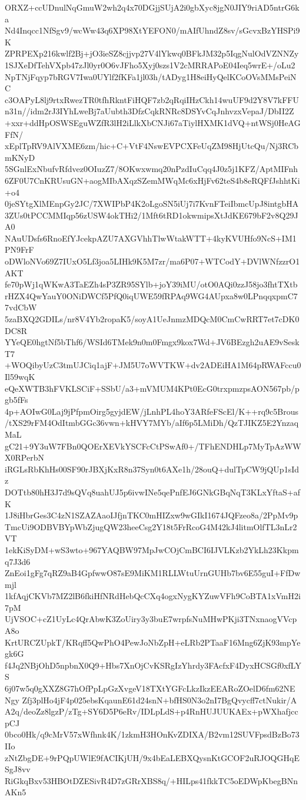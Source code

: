 ORXZ+ccUDnulNqGmuW2wh2q4x70DGjjSUjA2i0gbXyc8jgN0JIY9riAD5ntrG6ka
Nd4Inqcc1NfSgv9/wcWw43q6XP98XtYEFON0/mAIfUhndZ8sv/sGcvxBzYHSPi9K
ZPRPEXp216kwlf2Bj+jO3ieSZ8cjjvp27V4lYkwq0BFkJM32p5IqgNulOdVZNNZy
1SJXeDfTehVXpb47zJl0yr0O6vJFho5Xyj0szs1V2cMRRAPoE04Ieq5wrE+/oLu2
NpTNjFqyp7bRGV7Iwa0UYlf2fKFa1jl03h/tADyg1H8eiHyQelKCoOVsMMsPeiNC
c3OAPyL8lj9rtxRwezTR0tfhRkntFiHQF7zb2qRqiIHzCkh14wuUF9d2Y8V7kFFU
n31n//idm2rJ3IYhLweBj7aUubth3DfzCqkRNRc8DSYvCqJnhvzxVepaJ/DbII2Z
+xxr+ddHpOSWSEguWZfR3lH2iLlkXbCNJi67aTiylHXMK1dVQ+ntWSj0HeAGFfN/
xEplTpRV9AlVXME6zm/hic+C+VtF4NswEVPCXFeUqZM98HjUtcQu/Nj3RCbmKNyD
5SGnlExNbufvRfdvez0OIuzZ7/8OKwxwmq20nPzdIuCqq4J0z5j1KFZ/AptMIFnh
6ZF0U7CnKRUsuGN+aogMIbAXqzSZemMWqMc6xHjFv62teS4b8eRQFfJshhtKi+o4
0jeSYtgXlMEnpGy2JC/7XWIPbP4K2oLgoSN5iUj7i7KvnFTeiIbmcUpJ8intgbHA
3ZUs0tPCCMMIqp56zUSW4okTHi2/1Mft6tRD1okwmipsXtJdKE679bF2v8Q29JA0
NAuUDsfs6RnoEfYJcekpAZU7AXGVhhTlwWtakWTT+4kyKVUHfo9NcS+IM1PN9FrF
oDWloNVo69Z7IUxO5Lf3joa5LIHk9K5M7zr/ma6P07+WTCodY+DVlWNfzzrO1AKT
fe70pWj1qWKwA3TaEZh4sP3ZR95SYlb+joY39iMU/otO0AQi0zzJ58jo3fhtTXtb
rHZX4QwYauY0ONiDWCf5PfQ0iqUWE59fRPAq9WG4AUpxa8w0LPnqqxpmC77vdCbW
5zaBXQ2GDILs/nr8V4Yb2ropaK5/soyA1UeJnmzMDQcM0CmCwRRT7et7cDK0DC8R
YYeQE0hgtNf5bThf6/WSId6TMek9n0m0Fmgx9kox7Wd+JV6BEzgh2uAE9vSeskT7
+WOQibyUzC3tmUJCiq1ajF+JM5U7oWVTKW+dv2ADEiHA1M64pRWAFccu0Il59wqK
eQeXWTB3hFVKLSCiF+SSbU/a3+mVMUM4KPt0EcG0trxpmzpsAON567pb/pgb5fFs
4p+AOIwG0Laj9jPfpmOirg5gyjdEW/jLnhPL4hoY3ARfeFScEl/K++rq9c5Brous
/tXS29rFM4OdItmbGGc36vwn+kHVY7MYb/aIf6p5LMiDh/QzTJIKZ5E2YnzaqMaL
gC21+9Y3uW7FBn0QOErXEVkYSCFcCtPSwAf0+/TFhENDHLp7MyTpAzWWX0RPerbN
iRGLsRbKhHs00SF90rJBXjKxR8n37Syn0t6AXe1h/28ouQ+dulTpCW9jQUp1sIdz
DOTtb80hH3J7d9sQVq8uahUJ5p6ivwINe5qePnfEJ6GNkGBqNqT3KLxYftaS+afK
1J8iHbrGes3C4zN1SZAZAaoIJfjnTKC0mHIZxw9wGIkI1674JQFzeo8a/2PpMv9p
TmcUi9ODBVBYpWbZjugQW23heeCsg2Y18t5FrRcoG4M42kJ4litmOlfTL3nLr2VT
1ekKiSyDM+wS3wto+967YAQBW97MpJwCOjCmBCI6IJVLKzb2YkLh23Kkpmq7J3d6
ZnEoi1gFg7qRZ9aB4GpfwwO87sE9MiKM1RLLWtuUrnGUHb7bv6E55guI+FfDwmjl
1kfAqjCKVb7MZ2lB6fkiHfNRdHebQcCXq4ogxNygKYZuwVFh9CoBTA1xVmH2i7pM
UjVSOC+cZ1UyLc4QrAbwK3ZoUiry3y3buE7wrpfsNuMHwPKji3TNxnaogVVcpA8o
KrtURCZUpkT/KRqff5QwPhO4PewJoNbZpH+eLRb2PTaaF16Mng6ZjK93mpYegk6G
f4Jq2NBjOhD5npbnX0Q9+Hbs7XnOjCvKSRgIzYhrdy3FAcfxF4DyxHCSGf0xfLYS
6j07w5q0gXXZ8G7hOfPpLpGzXvgeV18TXtYGFcLkzIkzEEARoZOelD6fm62NENgy
Zfj3plHo4jF4p025ebsKqaunE61d24snN+bfHS0N3o2nI7BgQvycff7ctNukir/A
A2q/deoZz8lgzP/zTg+SY6D5P6eRv/IDLpLdS+p4RnHUJUUKAEx+pWXhafjccpCJ
0bco0Hk/q9cMrV57xWfhnk4K/1zkmH3HOnKvZDIXA/B2vm12SUVFpsdBzBo73IIo
zNtZbgDE+9rPQpUWlE9fACIKjUH/9x4bEaLEBXQysnKtGCOF2uRJOQGHqESgJ8vv
RiGkqBxv53HBOtDZESivR4D7zGRrXBS8q/+HILps41fkkTC5oEDWpKbegBNnAKn5
